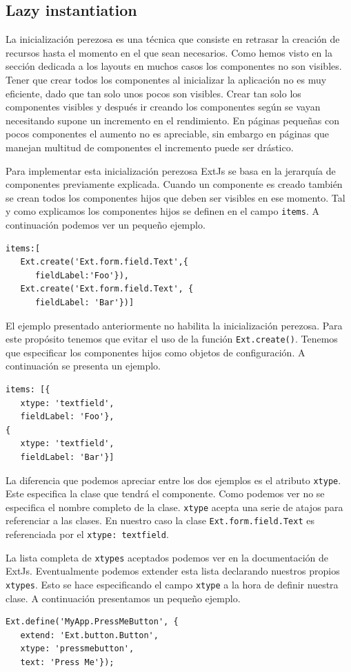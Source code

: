 	\subsection{Lazy instantiation}
		La inicialización perezosa es una técnica que consiste en retrasar la creación de recursos hasta el momento en el que sean necesarios.
		Como hemos visto en la sección dedicada a los layouts en muchos casos los componentes no son visibles. Tener que crear todos los
		componentes al inicializar la aplicación no es muy eficiente, dado que tan solo unos pocos son visibles. Crear tan solo los
		componentes visibles y después ir creando los componentes según se vayan necesitando supone un incremento en el rendimiento. En
		páginas pequeñas con pocos componentes el aumento no es apreciable, sin embargo en páginas que manejan multitud de componentes el
		incremento puede ser drástico. 
		\par
		Para implementar esta inicialización perezosa ExtJs se basa en la jerarquía de componentes previamente explicada. Cuando un componente
		es creado también se crean todos los componentes hijos que deben ser visibles en ese momento. Tal y como explicamos los componentes
		hijos se definen en el campo \texttt{items}. A continuación podemos ver un pequeño ejemplo. 
		\begin{lstlisting}[style=myJs]
items:[
   Ext.create('Ext.form.field.Text',{
      fieldLabel:'Foo'}),
   Ext.create('Ext.form.field.Text', {
      fieldLabel: 'Bar'})]
		\end{lstlisting}
		\par
		El ejemplo presentado anteriormente no habilita la inicialización perezosa. Para este propósito tenemos que evitar el uso de la
		función \texttt{Ext.create()}. Tenemos que especificar los componentes hijos como objetos de configuración. A continuación se presenta
		un ejemplo.
		\begin{lstlisting}[style=myJs]
items: [{
   xtype: 'textfield',
   fieldLabel: 'Foo'},
{
   xtype: 'textfield',
   fieldLabel: 'Bar'}]
		\end{lstlisting}
		\par
		La diferencia que podemos apreciar entre los dos ejemplos es el atributo \texttt{xtype}. Este especifica la clase que tendrá el
		componente.  Como podemos ver no se especifica el nombre completo de la clase. \texttt{xtype} acepta una serie de atajos para
		referenciar a las clases. En nuestro caso la clase \texttt{Ext.form.field.Text} es referenciada por el \texttt{xtype:\cc
		textfield\cc}.
		\par
		La lista completa de \texttt{xtypes} aceptados podemos ver en la documentación de ExtJs\cite{ExtJsDoc}. Eventualmente podemos extender
		esta lista declarando nuestros propios \texttt{xtypes}. Esto se hace especificando el campo \texttt{xtype} a la hora de definir
		nuestra clase. A continuación presentamos un pequeño ejemplo.
		\begin{lstlisting}[style=myJs]
Ext.define('MyApp.PressMeButton', {
   extend: 'Ext.button.Button',
   xtype: 'pressmebutton',
   text: 'Press Me'});
		\end{lstlisting}

